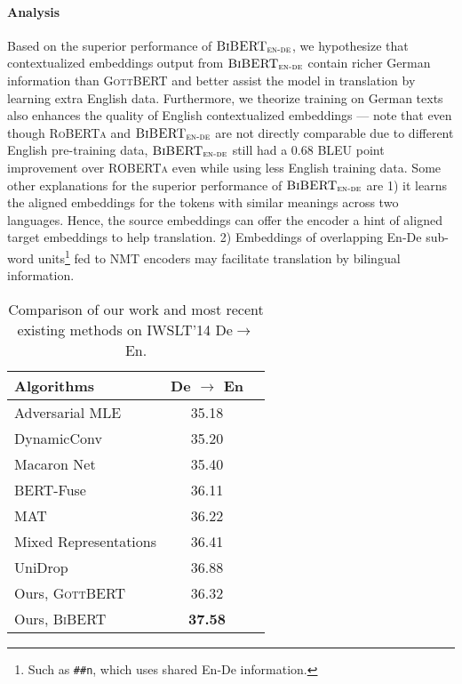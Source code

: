 \documentclass[11pt]{article}
\begin{document}
\paragraph{Analysis}
Based on the superior performance of $\textsc{BiBERT}_\textsc{en-de}$, we hypothesize that contextualized embeddings output from $\textsc{BiBERT}_\textsc{en-de}$ contain richer German information than \textsc{GottBERT} and better assist the model in translation by learning extra English data. Furthermore, we theorize training on German texts also enhances the quality of English contextualized embeddings --- note that even though \textsc{RoBERTa} and $\textsc{BiBERT}_\textsc{en-de}$ are not directly comparable due to different English pre-training data, $\textsc{BiBERT}_\textsc{en-de}$ still had a 0.68 BLEU point improvement over \textsc{ROBERTa} even while using less English training data. Some other explanations for the superior performance of $\textsc{BiBERT}_\textsc{en-de}$ are 1) it learns the aligned embeddings for the tokens with similar meanings across two languages. Hence, the source embeddings can offer the encoder a hint of aligned target embeddings to help translation. 2) Embeddings of overlapping En-De sub-word units\footnote{Such as \texttt{\#\#n}, which uses shared En-De information.} fed to NMT encoders may facilitate translation by bilingual information. 


\begin{table}[ht]
\begin{small}
\centering
\begin{tabular}{l|cc}

\hline
Algorithms & De $\rightarrow$ En \\
\hline
Adversarial MLE \citep{WangG019} & 35.18 \\
DynamicConv\citep{wu2018pay} & 35.20 \\
Macaron Net \citep{lu*2020understanding} & 35.40\\
BERT-Fuse \citep{Zhu2020Incorporating} & 36.11 \\
MAT \citep{fan2020multi} & 36.22  \\
Mixed Representations \citep{wu2020sequence}  & 36.41 \\
UniDrop \citep{wu-etal-2021-unidrop}  & 36.88 \\
\hline
Ours, \textsc{GottBERT} & 36.32 \\
Ours, \textsc{BiBERT} & \bf 37.58 \\

\hline

\end{tabular}
\caption{Comparison of our work and most recent existing methods on IWSLT'14 De$\rightarrow$En.}
\label{tab:iwslt14-previous}
\end{small}
\end{table}
\end{document}
